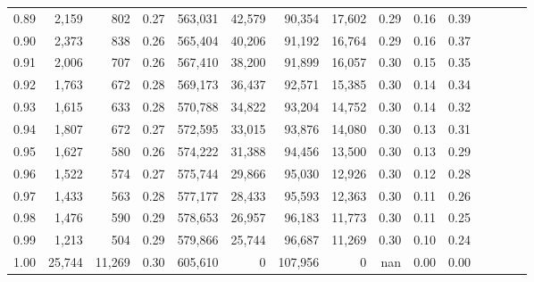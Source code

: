 \begin{tabular}{rrrcrrrrrrrrrrr}
0.89 &   2,159 &     802 &                                       0.27 &  563,031 &   42,579 &   90,354 &   17,602 &  0.29 &  0.16 &                         0.39 \\
0.90 &   2,373 &     838 &                                       0.26 &  565,404 &   40,206 &   91,192 &   16,764 &  0.29 &  0.16 &                         0.37 \\
0.91 &   2,006 &     707 &                                       0.26 &  567,410 &   38,200 &   91,899 &   16,057 &  0.30 &  0.15 &                         0.35 \\
0.92 &   1,763 &     672 &                                       0.28 &  569,173 &   36,437 &   92,571 &   15,385 &  0.30 &  0.14 &                         0.34 \\
0.93 &   1,615 &     633 &                                       0.28 &  570,788 &   34,822 &   93,204 &   14,752 &  0.30 &  0.14 &                         0.32 \\
0.94 &   1,807 &     672 &                                       0.27 &  572,595 &   33,015 &   93,876 &   14,080 &  0.30 &  0.13 &                         0.31 \\
0.95 &   1,627 &     580 &                                       0.26 &  574,222 &   31,388 &   94,456 &   13,500 &  0.30 &  0.13 &                         0.29 \\
0.96 &   1,522 &     574 &                                       0.27 &  575,744 &   29,866 &   95,030 &   12,926 &  0.30 &  0.12 &                         0.28 \\
0.97 &   1,433 &     563 &                                       0.28 &  577,177 &   28,433 &   95,593 &   12,363 &  0.30 &  0.11 &                         0.26 \\
0.98 &   1,476 &     590 &                                       0.29 &  578,653 &   26,957 &   96,183 &   11,773 &  0.30 &  0.11 &                         0.25 \\
0.99 &   1,213 &     504 &                                       0.29 &  579,866 &   25,744 &   96,687 &   11,269 &  0.30 &  0.10 &                         0.24 \\
1.00 &  25,744 &  11,269 &                                       0.30 &  605,610 &        0 &  107,956 &        0 &   nan &  0.00 &                         0.00 \\
\bottomrule
\end{tabular}
